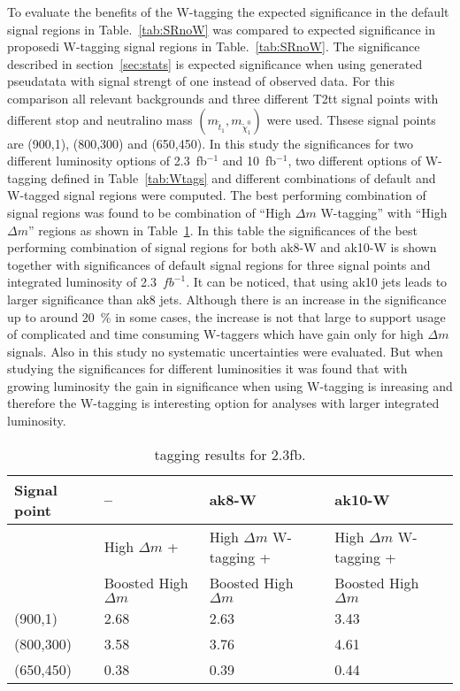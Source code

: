 To evaluate the benefits of the W-tagging  the expected significance in the default signal regions in Table.~\ref{tab:SRnoW} was compared to expected significance in proposedi W-tagging signal regions in Table.~\ref{tab:SRnoW}. The significance described in section~\ref{sec:stats} is expected significance when using generated pseudatata with signal strengt of one instead of observed data. For this comparison all relevant backgrounds and three different T2tt signal points with different stop and neutralino mass $(m_{\tilde{t}_{1}}, m_{\tilde{\chi}^{0}_{1}})$ were used. Thsese signal points are (900,1), (800,300) and (650,450). In this study the significances for two different luminosity options of 2.3~fb$^{-1}$ and 10~fb$^{-1}$, two different options of W-tagging defined in Table~\ref{tab:Wtags} and different combinations of default and W-tagged signal regions were computed. The best performing combination of signal regions was found to be combination of ``High $\Delta m$ W-tagging'' with ``High $\Delta m$'' regions as shown in Table~\ref{tab:taggingResults}. In this table the significances of the best performing combination of signal regions for both ak8-W and ak10-W is shown together with significances of default signal regions for three signal points and integrated luminosity of 2.3~$fb^{-1}$. It can be noticed, that using ak10 jets leads to larger significance than ak8 jets. Although there is an increase in the significance up to around 20~\% in some cases, the increase is not that large to support usage of complicated and time consuming W-taggers which have gain only for high $\Delta m$ signals. Also in this study no systematic uncertainties were evaluated. But when studying the significances for different luminosities it was found that with growing luminosity the gain in significance when using W-tagging is inreasing and therefore the W-tagging is interesting option for analyses with larger integrated luminosity. 

\begin{table}[h]
\begin{center}
\begin{tabular}{|l|l|l|l|}
\hline
Signal point             & --      & ak8-W & ak10-W \\
\hline
                       & High $\Delta m$ +           &  High $\Delta m$ W-tagging +  &   High $\Delta m$ W-tagging +  \\
                       &  Boosted High $\Delta m$    & Boosted High $\Delta m$       &   Boosted High $\Delta m$  \\
\hline
\hline
(900,1) &     2.68 & 2.63 & 3.43  \\
\hline
(800,300) &   3.58 & 3.76 & 4.61  \\
\hline
(650,450) &   0.38 & 0.39 & 0.44  \\
\hline
\end{tabular}
\caption[Table caption text]{tagging results for 2.3fb. }
\label{tab:taggingResults}
\end{center}
\end{table}


